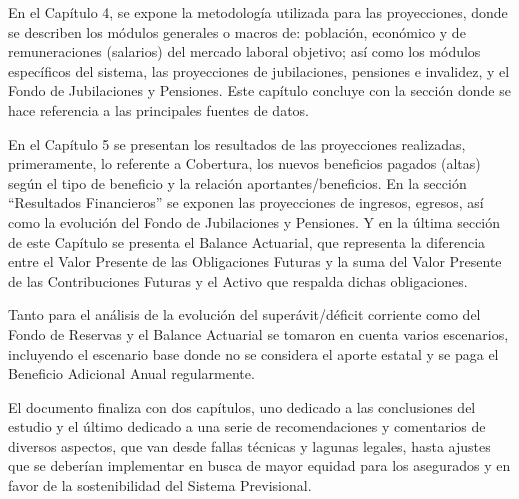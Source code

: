 \documentclass[a4paper,11pt]{article}
\begin{document}
En el Capítulo 4, se expone la metodología utilizada para las proyecciones, donde se describen los módulos generales o macros de: población, económico y de remuneraciones (salarios) del mercado laboral objetivo; así como los módulos específicos del sistema, las proyecciones de jubilaciones, pensiones e invalidez, y el Fondo de Jubilaciones y Pensiones.  Este capítulo concluye con la sección donde se hace referencia a las principales fuentes de datos.

En el Capítulo 5 se presentan los resultados de las proyecciones realizadas, primeramente, lo referente a Cobertura, los nuevos beneficios pagados (altas) según el tipo de beneficio y la relación aportantes/beneficios.  En la sección “Resultados Financieros” se exponen las proyecciones de ingresos, egresos, así como la evolución del Fondo de Jubilaciones y Pensiones. Y en la última sección de este Capítulo se presenta el Balance Actuarial, que representa la diferencia entre el Valor Presente de las Obligaciones Futuras y la suma del Valor Presente de las Contribuciones Futuras y el Activo que respalda dichas obligaciones.

Tanto para el análisis de la evolución del superávit/déficit corriente como del Fondo de Reservas y el Balance Actuarial se tomaron en cuenta varios escenarios, incluyendo el escenario base donde no se considera el aporte estatal y se paga el Beneficio Adicional Anual regularmente.

El documento finaliza con dos capítulos, uno dedicado a las conclusiones del estudio y el último dedicado a una serie de recomendaciones y comentarios de diversos aspectos, que van desde fallas técnicas y lagunas legales, hasta ajustes que se deberían implementar en busca de mayor equidad para los asegurados y en favor de la sostenibilidad del Sistema Previsional.


\end{document}
